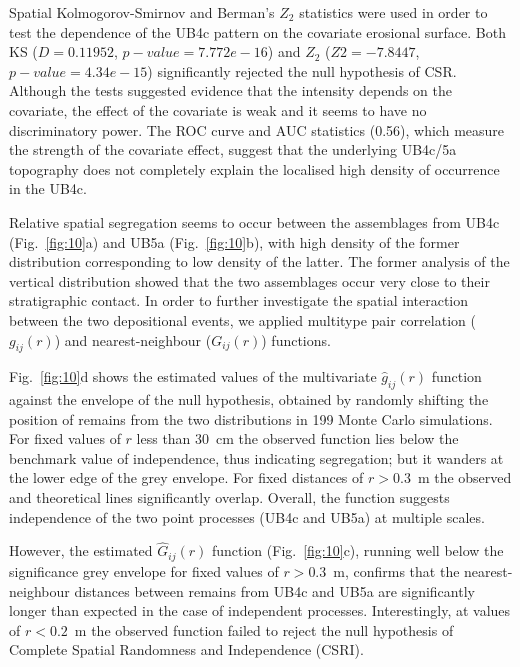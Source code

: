 \documentclass[review,authoryear,times]{elsarticle} %
\begin{document}
Spatial Kolmogorov-Smirnov and Berman's $Z_2$ \citep{Berman1986} statistics were used in order to test the dependence of the UB4c pattern on the covariate erosional surface. Both KS ($D=0.11952$, $p-value=7.772e-16$) and $Z_2$ ($Z2=-7.8447$, $p-value=4.34e-15$) significantly rejected the null hypothesis of CSR. Although the tests suggested evidence that the intensity depends on the covariate, the effect of the covariate is weak and it seems to have no discriminatory power. The ROC curve and AUC statistics (0.56), which measure the strength of the covariate effect, suggest that the underlying UB4c/5a topography does not completely explain the localised high density of occurrence in the UB4c.

Relative spatial segregation seems to occur between the assemblages from UB4c (Fig.~\ref{fig:10}a) and UB5a (Fig.~\ref{fig:10}b), with high density of the former distribution corresponding to low density of the latter. The former analysis of the vertical distribution showed that the two assemblages occur very close to their stratigraphic contact. In order to further investigate the spatial interaction between the two depositional events, we applied multitype pair correlation ($g_{ij}(r)$) and nearest-neighbour ($G_{ij}(r)$) functions.

Fig.~\ref{fig:10}d shows the estimated values of the multivariate $\hat{g}_{ij}(r)$ function against the envelope of the null hypothesis, obtained by randomly shifting the position of remains from the two distributions in 199 Monte Carlo simulations. For fixed values of $r$ less than 30~cm the observed function lies below the benchmark value of independence, thus indicating segregation; but it wanders at the lower edge of the grey envelope. For fixed distances of $r>0.3$~m the observed and theoretical lines significantly overlap. Overall, the function suggests independence of the two point processes (UB4c and UB5a) at multiple scales.

However, the estimated $\hat{G}_{ij}(r)$ function (Fig.~\ref{fig:10}c), running well below the significance grey envelope for fixed values of $r>0.3$~m, confirms that the nearest-neighbour distances between remains from UB4c and UB5a are significantly longer than expected in the case of independent processes. Interestingly, at values of $r<0.2$~m the observed function failed to reject the null hypothesis of Complete Spatial Randomness and Independence (CSRI).
\end{document}
